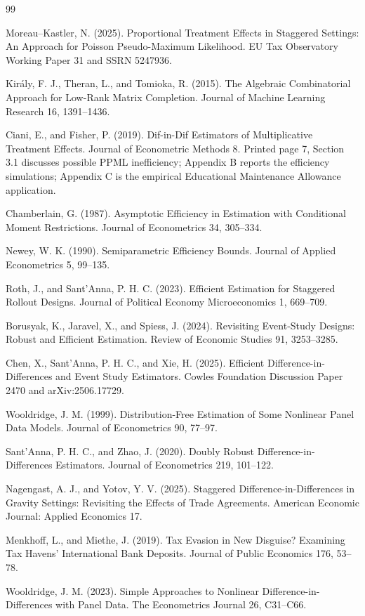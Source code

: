 \documentclass{article}
\begin{document}
\begin{thebibliography}{99}

   Moreau--Kastler, N. (2025). Proportional Treatment Effects in Staggered Settings: An Approach for Poisson Pseudo-Maximum Likelihood. EU Tax Observatory Working Paper 31 and SSRN 5247936.

   Király, F. J., Theran, L., and Tomioka, R. (2015). The Algebraic Combinatorial Approach for Low-Rank Matrix Completion. Journal of Machine Learning Research 16, 1391--1436.

   Ciani, E., and Fisher, P. (2019). Dif-in-Dif Estimators of Multiplicative Treatment Effects. Journal of Econometric Methods 8. Printed page 7, Section 3.1 discusses possible PPML inefficiency; Appendix B reports the efficiency simulations; Appendix C is the empirical Educational Maintenance Allowance application.

   Chamberlain, G. (1987). Asymptotic Efficiency in Estimation with Conditional Moment Restrictions. Journal of Econometrics 34, 305--334.

   Newey, W. K. (1990). Semiparametric Efficiency Bounds. Journal of Applied Econometrics 5, 99--135.

   Roth, J., and Sant'Anna, P. H. C. (2023). Efficient Estimation for Staggered Rollout Designs. Journal of Political Economy Microeconomics 1, 669--709.

   Borusyak, K., Jaravel, X., and Spiess, J. (2024). Revisiting Event-Study Designs: Robust and Efficient Estimation. Review of Economic Studies 91, 3253--3285.

   Chen, X., Sant'Anna, P. H. C., and Xie, H. (2025). Efficient Difference-in-Differences and Event Study Estimators. Cowles Foundation Discussion Paper 2470 and arXiv:2506.17729.

   Wooldridge, J. M. (1999). Distribution-Free Estimation of Some Nonlinear Panel Data Models. Journal of Econometrics 90, 77--97.

   Sant'Anna, P. H. C., and Zhao, J. (2020). Doubly Robust Difference-in-Differences Estimators. Journal of Econometrics 219, 101--122.

   Nagengast, A. J., and Yotov, Y. V. (2025). Staggered Difference-in-Differences in Gravity Settings: Revisiting the Effects of Trade Agreements. American Economic Journal: Applied Economics 17.

   Menkhoff, L., and Miethe, J. (2019). Tax Evasion in New Disguise? Examining Tax Havens' International Bank Deposits. Journal of Public Economics 176, 53--78.

   Wooldridge, J. M. (2023). Simple Approaches to Nonlinear Difference-in-Differences with Panel Data. The Econometrics Journal 26, C31--C66.

\end{thebibliography}
\end{document}
